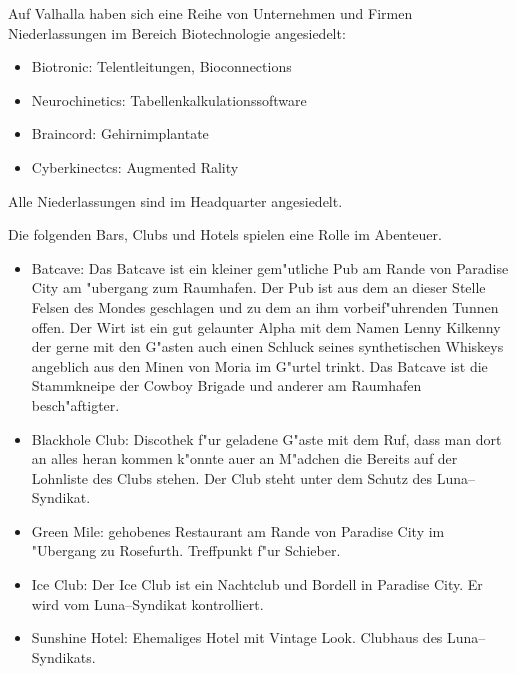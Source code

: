 
Auf Valhalla haben sich eine Reihe von Unternehmen und Firmen Niederlassungen im Bereich Biotechnologie angesiedelt:

\begin{itemize}
    \item Biotronic: Telentleitungen, Bioconnections
    \item Neurochinetics: Tabellenkalkulationssoftware
    \item Braincord: Gehirnimplantate
    \item Cyberkinectcs: Augmented Rality
\end{itemize}

Alle Niederlassungen sind im Headquarter angesiedelt.


Die folgenden Bars, Clubs und Hotels spielen eine Rolle im Abenteuer.

\begin{itemize}
    \item Batcave: Das Batcave ist ein kleiner gem"utliche Pub am Rande von Paradise City am "ubergang zum Raumhafen. Der Pub ist aus dem an dieser Stelle Felsen des Mondes geschlagen und zu dem an ihm vorbeif"uhrenden Tunnen offen. Der Wirt ist ein gut gelaunter Alpha mit dem Namen Lenny Kilkenny der gerne mit den G"asten auch einen Schluck seines synthetischen Whiskeys angeblich aus den Minen von Moria im G"urtel trinkt. Das Batcave ist die Stammkneipe der Cowboy Brigade und anderer am Raumhafen besch"aftigter.
    \item Blackhole Club: Discothek f"ur geladene G"aste mit dem Ruf, dass man dort an alles heran kommen k"onnte au\3er an M"adchen die Bereits auf der Lohnliste des Clubs stehen. Der Club steht unter dem Schutz des Luna--Syndikat.
    \item Green Mile: gehobenes Restaurant am Rande von Paradise City im "Ubergang zu Rosefurth.  Treffpunkt f"ur Schieber.
    \item Ice Club: Der Ice Club ist ein Nachtclub und Bordell in Paradise City. Er wird vom Luna--Syndikat kontrolliert.
    \item Sunshine Hotel: Ehemaliges Hotel mit Vintage Look. Clubhaus des Luna--Syndikats.
    
\end{itemize}


